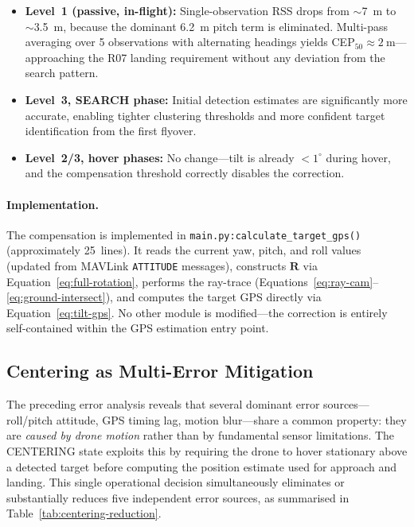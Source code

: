\begin{itemize}
  \item \textbf{Level~1 (passive, in-flight):} Single-observation RSS drops from $\sim$\SI{7}{\metre} to $\sim$\SI{3.5}{\metre}, because the dominant \SI{6.2}{\metre} pitch term is eliminated.  Multi-pass averaging over 5 observations with alternating headings yields CEP$_{50} \approx \SI{2}{\metre}$---approaching the R07 landing requirement without any deviation from the search pattern.
  \item \textbf{Level~3, SEARCH phase:} Initial detection estimates are significantly more accurate, enabling tighter clustering thresholds and more confident target identification from the first flyover.
  \item \textbf{Level~2/3, hover phases:} No change---tilt is already $< 1^{\circ}$ during hover, and the compensation threshold correctly disables the correction.
\end{itemize}

\paragraph{Implementation.}
The compensation is implemented in \texttt{main.py:calculate\_target\_gps()} (approximately 25~lines).  It reads the current yaw, pitch, and roll values (updated from MAVLink \texttt{ATTITUDE} messages), constructs $\mathbf{R}$ via Equation~\ref{eq:full-rotation}, performs the ray-trace (Equations~\ref{eq:ray-cam}--\ref{eq:ground-intersect}), and computes the target GPS directly via Equation~\ref{eq:tilt-gps}.  No other module is modified---the correction is entirely self-contained within the GPS estimation entry point.

\subsection{Centering as Multi-Error Mitigation}\label{sec:centering-mitigation}

The preceding error analysis reveals that several dominant error sources---roll/pitch attitude, GPS timing lag, motion blur---share a common property: they are \emph{caused by drone motion} rather than by fundamental sensor limitations.  The CENTERING state exploits this by requiring the drone to hover stationary above a detected target before computing the position estimate used for approach and landing.  This single operational decision simultaneously eliminates or substantially reduces five independent error sources, as summarised in Table~\ref{tab:centering-reduction}.

